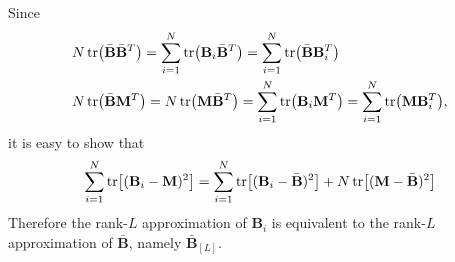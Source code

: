 \begin{exercise}
  Since
  \begin{subequations}
    \begin{align}
      & N\tr(\bar{\mathbf{B}}\bar{\mathbf{B}}^T) = \sum_{i=1}^N
      \tr(\mathbf{B}_i\bar{\mathbf{B}}^T) = \sum_{i=1}^N
      \tr(\bar{\mathbf{B}}\mathbf{B}_i^T) \\ 
      & N\tr(\bar{\mathbf{B}}\mathbf{M}^T) = N\tr(\mathbf{M}\bar{\mathbf{B}}^T)=
      \sum_{i=1}^N \tr(\mathbf{B}_i\mathbf{M}^T) = \sum_{i=1}^N
      \tr(\mathbf{M}\mathbf{B}_i^T),
    \end{align}
  \end{subequations}
  it is easy to show that
  \begin{align}
    \sum_{i=1}^N \tr[(\mathbf{B}_i - \mathbf{M})^2] = \sum_{i=1}^N
    \tr[(\mathbf{B}_i - \bar{\mathbf{B}})^2] + N
    \tr[(\mathbf{M} - \bar{\mathbf{B}})^2]
  \end{align}
  Therefore the rank-$L$ approximation of $\mathbf{B}_i$ is equivalent to the
  rank-$L$ approximation of $\bar{\mathbf{B}}$, namely $\bar{\mathbf{B}}_{[L]}$.
\end{exercise}

